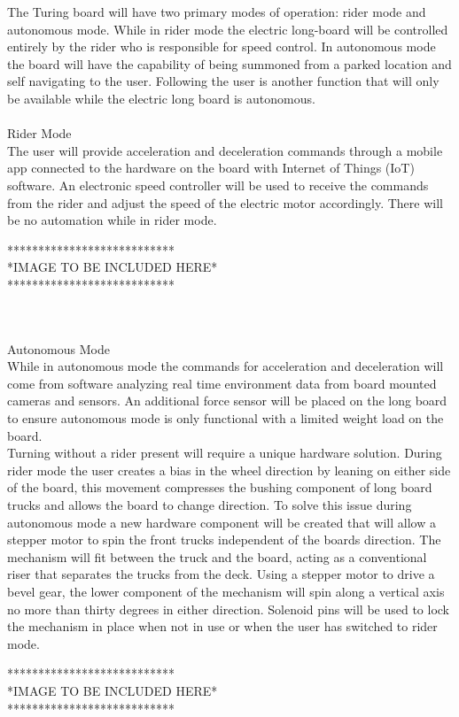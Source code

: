 The Turing board will have two primary modes of operation: rider mode and autonomous mode. While in rider mode the electric long-board will be controlled entirely by the rider who is responsible for speed control. In autonomous mode the board will have the capability of being summoned from a parked location and self navigating to the user. Following the user is another function that will only be available while the electric long board is autonomous. \\
\\
Rider Mode \\
The user will provide acceleration and deceleration commands through a mobile app connected to the hardware on the board with Internet of Things (IoT) software. An electronic speed controller will be used to receive the commands from the rider and adjust the speed of the electric motor accordingly. There will be no automation while in rider mode.\\
\centerline
{
***************************\\
*IMAGE TO BE INCLUDED HERE*\\
***************************\\
}
\\
\\
Autonomous Mode \\
While in autonomous mode the commands for acceleration and deceleration will come from software analyzing real time environment data from board mounted cameras and sensors. An additional force sensor will be placed on the long board to ensure autonomous mode is only functional with a limited weight load on the board. \\
Turning without a rider present will require a unique hardware solution. During rider mode the user creates a bias in the wheel direction by leaning on either side of the board, this movement compresses the bushing component of long board trucks and allows the board to change direction. To solve this issue during autonomous mode a new hardware component will be created that will allow a stepper motor to spin the front trucks independent of the boards direction. The mechanism will fit between the truck and the board, acting as a conventional riser that separates the trucks from the deck. Using a stepper motor to drive a bevel gear, the lower component of the mechanism will spin along a vertical axis no more than thirty degrees in either direction. Solenoid pins will be used to lock the mechanism in place when not in use or when the user has switched to rider mode. \\
\centerline
{
***************************\\
*IMAGE TO BE INCLUDED HERE*\\
***************************\\
} 
